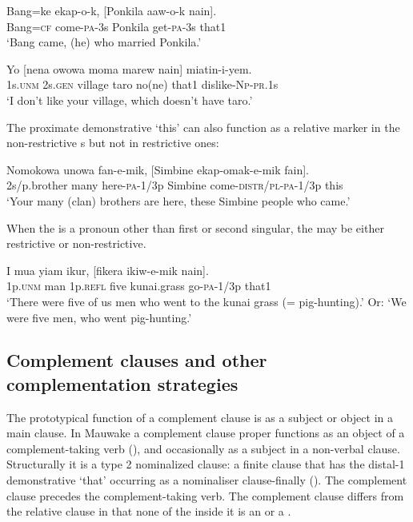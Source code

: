 \ea%
\label{ex:8:x1567}
\gll Bang=ke  ekap-o-k,  [Ponkila  aaw-o-k  nain].\\
Bang=\textsc{cf} come-\textsc{pa}-3s Ponkila get-\textsc{pa}-3s  that1\\
\glt`Bang came, (he) who married Ponkila.'
\z


\ea%
\label{ex:8:x1568}
\gll Yo  [nena  owowa  moma  marew  nain]  miatin-i-yem. \\
1s.\textsc{unm} 2s.\textsc{gen} village  taro  no(ne)  that1 dislike-\textsc{Np}-\textsc{pr}.1s\\
\glt`I don't like your village, which doesn't have taro.'
\z


The proximate demonstrative  `this' can also function as a relative marker in the non-restrictive s but not in restrictive ones:

\ea%
\label{ex:8:x1536}
\gll Nomokowa  unowa  fan-e-mik,  [Simbine ekap-omak-e-mik  fain].\\
2s/p.brother  many  here-\textsc{pa}-1/3p Simbine come-\textsc{distr}/\textsc{pl}-\textsc{pa}-1/3p this\\
\glt`Your many (clan) brothers are here, these Simbine people who came.'
\z


When the  is a pronoun other than first or second singular, the  may be either restrictive or non-restrictive.

\ea%
\label{ex:8:x1570}
\gll I  mua  yiam  ikur,  [fikera  ikiw-e-mik  nain]. \\
1p.\textsc{unm} man 1p.\textsc{refl} five kunai.grass go-\textsc{pa}-1/3p that1\\
\glt`There were five of us men who went to the kunai grass (= pig-hunting).' Or: `We were five men, who went pig-hunting.'
\z


\subsection{Complement clauses and other complementation strategies} \label{sec:8.3.2}

The prototypical function of a complement clause is as a subject or object in a main clause. In Mauwake a complement clause proper functions as an object of a complement-taking verb (), and occasionally as a subject in a non-verbal clause. Structurally it is a type 2 nominalized clause: a finite clause that has the distal-1 demonstrative  `that' occurring as a nominaliser clause-finally (). The complement clause precedes the complement-taking verb. The complement clause differs from the relative clause in that none of the  inside it is an  or a . 

